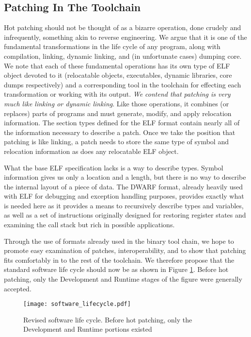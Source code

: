 \subsection{Patching In The Toolchain}
\label{ssec:patchingvlinking}
Hot patching should not be thought of as a bizarre operation, done
crudely and infrequently, something akin to reverse engineering. We
argue that it is one of the fundamental transformations in the life
cycle of any program, along with compilation, linking, dynamic
linking, and (in unfortunate cases) dumping core. We note that each of
these fundamental operations has its own type of ELF object devoted to
it (relocatable objects, executables, dynamic libraries, core dumps
respectively) and a corresponding tool in the toolchain for effecting
each transformation or working with its output. \emph{We contend that
  patching is very much like linking or dynamic linking}. Like those
operations, it combines (or replaces) parts of programs and must
generate, modify, and apply relocation information. The section types
defined for the ELF format contain nearly all of the information
necessary to describe a patch. Once we take the position that patching
is like linking, a patch needs to store the same type of symbol and
relocation information as does any relocatable ELF object.

What the base ELF specification lacks is a way to describe
types. Symbol information gives us only a location and a length, but
there is no way to describe the internal layout of a piece of
data. The DWARF format, already heavily used with ELF for debugging
and exception handling purposes, provides exactly what is needed here
as it provides a means to recursively describe types and variables, as
well as a set of instructions originally designed for restoring
register states and examining the call stack but rich in possible
applications. 

Through the use of formats already used in the binary tool chain, we
hope to promote easy examination of patches, interoperability, and to
show that patching fits comfortably in to the rest of the
toolchain. We therefore propose that the standard software life cycle
should now be as shown in Figure \ref{fig:lifecycle}. Before hot
patching, only the Development and Runtime stages of the figure were
generally accepted.

\begin{figure}[ht]
\begin{center}
\texttt{[image: software\_lifecycle.pdf]}
\end{center}
\caption{{\small Revised software life cycle. Before hot patching, only
    the Development and Runtime portions existed}}
\label{fig:lifecycle}
\end{figure}

